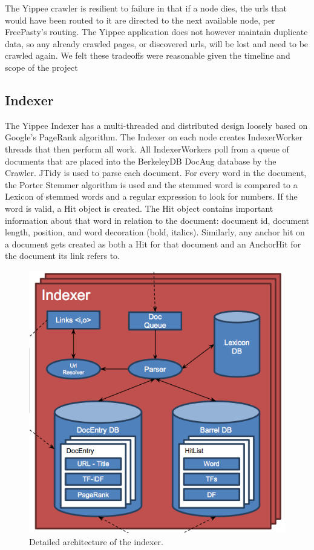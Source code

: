 \documentclass[11pt, letterpaper, oneside, twocolumn]{article}
\begin{document}
The Yippee crawler is resilient to failure in that if a node dies, the urls that would have been routed to it are directed to the next available node, per FreePasty's routing.
The Yippee application does not however maintain duplicate data, so any already crawled pages, or discovered urls, will be lost and need to be crawled again.
We felt these tradeoffs were reasonable given the timeline and scope of the project

\subsection{Indexer}

The Yippee Indexer has a multi-threaded and distributed design loosely based on Google's  PageRank algorithm\cite{pagerank}. 
The Indexer on each node creates IndexerWorker threads that then perform all work. 
All IndexerWorkers poll from a queue of documents that are placed into the BerkeleyDB DocAug database by the Crawler. 
JTidy is used to parse each document. 
For every word in the document, the Porter Stemmer algorithm is used and the stemmed word is compared to a Lexicon of stemmed words and a regular expression to look for numbers. 
If the word is valid, a Hit object is created. 
The Hit object contains important information about that word in relation to the document: document id, document length, position, and word decoration (bold, italics). 
Similarly, any anchor hit on a document gets created as both a Hit for that document and an AnchorHit for the document its link refers to. 

\label{sec:Indexer}
\begin{figure}[!b]
  \centering
  \includegraphics[scale=0.35]{figures/indexer_diagram.png}
  \caption{Detailed architecture of the indexer.}
\end{figure}
\end{document}
